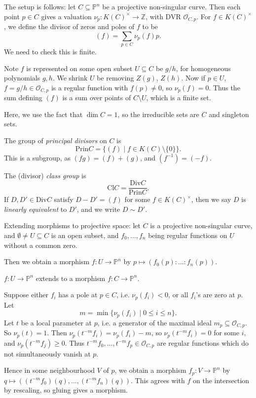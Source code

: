 \documentclass[12pt]{article}
\begin{document}
The setup is follows: let $C \subseteq \mathbb{P}^n$ be a projective non-singular curve. Then each point $p \in C$ gives a valuation $\nu_p : K(C)^\times \to \mathbb{Z}$, with DVR $\mathcal{O}_{C, p}$. For $f \in K(C)^\times$, we define the divisor of zeros and poles of $f$ to be
\[
	(f) = \sum_{p \in C} \nu_p(f) p.
\]
We need to check this is finite.

Note $f$ is represented on some open subset $U \subseteq C$ be $g/h$, for homogeneous polynomials $g, h$. We shrink $U$ be removing $Z(g)$, $Z(h)$. Now if $p \in U$, $f = g/h \in \mathcal{O}_{C, p}$ is a regular function with $f(p) \neq 0$, so $\nu_p(f) = 0$. Thus the sum defining $(f)$ is a sum over points of $C \setminus U$, which is a finite set.

Here, we use the fact that $\dim C = 1$, so the irreducible sets are $C$ and singleton sets.

\begin{definition}
	The group of \emph{principal divisors} on $C$ is
	\[
		\mathrm{Prin} C = \{(f) \mid f \in K(C) \setminus \{0\}\}.
	\]
	This is a subgroup, as $(fg) = (f) + (g)$, and $(f^{-1}) = (-f)$.

	The (divisor) \emph{class group} is
	\[
	\mathrm{Cl} C = \frac{\mathrm{Div} C}{\mathrm{Prin} C}.
	\]
	If $D, D' \in \mathrm{Div} C$ satisfy $D - D' = (f)$ for some $f \in K(C)^\times$, then we say $D$ is \emph{linearly equivalent} to $D'$, and we write $D \sim D'$.
\end{definition}

Extending morphisms to projective space: let $C$ is a projective non-singular curve, and $\emptyset \neq U \subseteq C$ is an open subset, and $f_0, \ldots, f_n$ being regular functions on $U$ without a common zero.

Then we obtain a morphism $f : U \to \mathbb{P}^n$ by $p \mapsto (f_0(p): \ldots: f_n(p))$.

\begin{theorem}
	$f : U \to \mathbb{P}^n$ extends to a morphism $f : C \to \mathbb{P}^n$.
\end{theorem}

\begin{proofbox}
	Suppose either $f_i$ has a pole at $p \in C$, i.e. $\nu_p(f_i) < 0$, or all $f_i$'s are zero at $p$. Let
	\[
		m = \min \{\nu_p(f_i) \mid 0 \leq i \leq n\}.
	\]
	Let $t$ be a local parameter at $p$, i.e. a generator of the maximal ideal $m_p \subseteq \mathcal{O}_{C, p}$. So $\nu_p(t) = 1$. Then $\nu_p(t^{-m} f_i) = \nu_p(f_i) - m$, so $\nu_p(t^{-m} f_i) = 0$ for some $i$, and $\nu_p(t^{-m} f_j) \geq 0$. Thus $t^{-m} f_0, \ldots, t^{-m} f_p \in \mathcal{O}_{C, p}$ are regular functions which do not simultaneously vanish at $p$.

	Hence in some neighbourhood $V$ of $p$, we obtain a morphism $f_p : V \to \mathbb{P}^n$ by $q \mapsto ((t^{-m} f_0)(q), \ldots, (t^{-m} f_n)(q))$. This agrees with $f$ on the intersection by rescaling, so gluing gives a morphism.
\end{proofbox}
\end{document}
